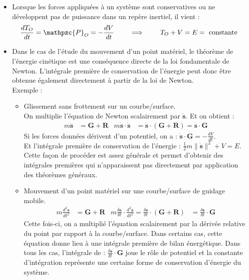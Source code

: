 \documentclass[a4paper]{article}
\begin{document}
\begin{itemize}
\item Lorsque les forces appliquées à un système sont conservatives ou ne développent pas de puissance dans un repère inertiel, il vient : 
\[ \frac{d T_O}{d t} = \mathpzc{P}_O = - \frac{d V}{d t} \qquad \implies \qquad T_O + V = E = \text{ constante } \]





\item Dans le cas de l'étude du mouvement d'un point matériel, le théorème de l'énergie cinétique est une conséquence directe de la loi fondamentale de Newton. L'intégrale première de conservation de l'énergie peut donc être obtenue également directement à partir de la loi de Newton. \\
Exemple : 
\begin{itemize}
    \item Glissement sans frottement sur un courbe/surface. \\
    On multiplie l'équation de Newton scalairement par $ \dot{\textbf{s}} $. Et on obtient : 
    \begin{align*} m \ddot{\textbf{s}} &= \textbf{G} + \textbf{R} &m \dot{\textbf{s}} \cdot \ddot{\textbf{s}} &= \dot{\textbf{s}} \cdot (\textbf{G} + \textbf{R}) = \dot{\textbf{s}} \cdot \textbf{G} \end{align*}
    Si les forces données dérivent d'un potentiel, on a : $\displaystyle \dot{\textbf{s}} \cdot \textbf{G} = - \frac{d V}{d t} $. \\
    Et l'intégrale première de conservation de l'énergie : $\displaystyle \frac{1}{2} m \| \dot{\textbf{s}} \|^2 + V = E $. \\
    Cette façon de procéder est assez générale et permet d'obtenir des intégrales premières qui n'apparaissent pas directement par application des théorèmes généraux.

    \item Mouvement d'un point matériel sur une courbe/surface de guidage mobile.
    \begin{align*} m \frac{d^2 \textbf{s}}{d t^2} &= \textbf{G} + \textbf{R} &m \frac{\delta \textbf{s}}{\delta t} \cdot \frac{d^2 \textbf{s}}{d t^2} = \frac{\delta \textbf{s}}{\delta t} \cdot (\textbf{G} + \textbf{R}) &= \frac{\delta \textbf{s}}{\delta t} \cdot \textbf{G} \end{align*}
    Cette fois-ci, on a multiplié l'équation scalairement par la dérivée relative du point par rapport à la courbe/surface. Dans certains cas, cette équation donne lieu à une intégrale première de bilan énergétique. Dans tous les cas, l'intégrale de : $\displaystyle \frac{\delta \textbf{s}}{\delta t} \cdot \textbf{G} $ joue le rôle de potentiel et la constante d'intégration représente une certaine forme de conservation d'énergie du système.
\end{itemize}






\end{itemize}
\end{document}
